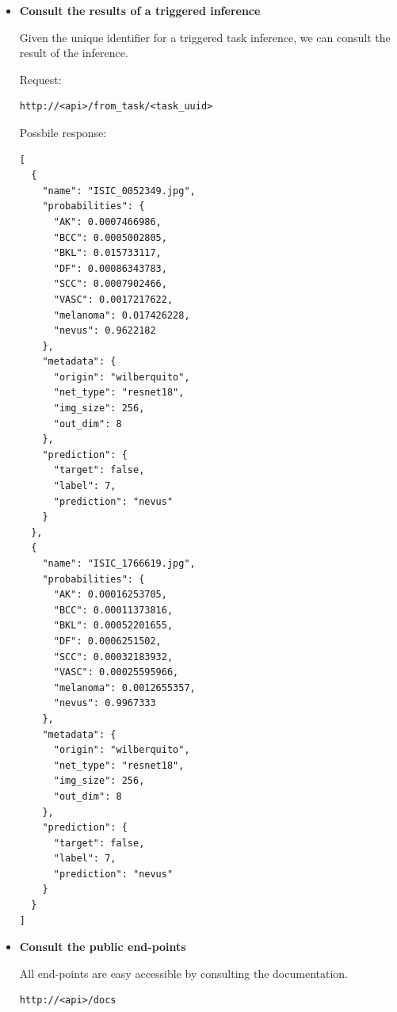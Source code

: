 \begin{itemize}
\begin{Verbatim}[fontsize=\scriptsize]
{
  "task_uuid": "77d5e834-60a1-49b6-a71a-b3472dc21ce5",
  "num_images": 2
}
\end{Verbatim}


  \item {\bf Consult the results of a triggered inference}

Given the unique identifier for a triggered task inference, we can consult the
result of the inference.

Request:

\begin{Verbatim}[fontsize=\scriptsize]
http://<api>/from_task/<task_uuid>
\end{Verbatim}

Possbile response:


\begin{Verbatim}[fontsize=\scriptsize]
[
  {
    "name": "ISIC_0052349.jpg",
    "probabilities": {
      "AK": 0.0007466986,
      "BCC": 0.0005002805,
      "BKL": 0.015733117,
      "DF": 0.00086343783,
      "SCC": 0.0007902466,
      "VASC": 0.0017217622,
      "melanoma": 0.017426228,
      "nevus": 0.9622182
    },
    "metadata": {
      "origin": "wilberquito",
      "net_type": "resnet18",
      "img_size": 256,
      "out_dim": 8
    },
    "prediction": {
      "target": false,
      "label": 7,
      "prediction": "nevus"
    }
  },
  {
    "name": "ISIC_1766619.jpg",
    "probabilities": {
      "AK": 0.00016253705,
      "BCC": 0.00011373816,
      "BKL": 0.00052201655,
      "DF": 0.0006251502,
      "SCC": 0.00032183932,
      "VASC": 0.00025595966,
      "melanoma": 0.0012655357,
      "nevus": 0.9967333
    },
    "metadata": {
      "origin": "wilberquito",
      "net_type": "resnet18",
      "img_size": 256,
      "out_dim": 8
    },
    "prediction": {
      "target": false,
      "label": 7,
      "prediction": "nevus"
    }
  }
]
\end{Verbatim}



  \item {\bf Consult the public end-points}

All end-points are easy accessible by consulting the documentation.

\begin{Verbatim}[fontsize=\scriptsize]
http://<api>/docs
\end{Verbatim}


\end{itemize}

